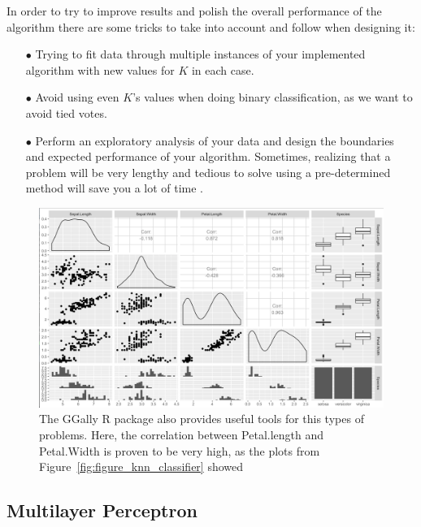 In order to try to improve results and polish the overall performance of the algorithm there are some tricks to take into account and follow when designing it: 

\begin{itemize}
	
	\item[$\bullet$] Trying to fit data through multiple instances of your implemented algorithm with new values for $K$ in each case.
	
	\item[$\bullet$] Avoid using even $K$'s values when doing binary classification, as we want to avoid tied votes.
	
	\item[$\bullet$] Perform an exploratory analysis of your data and design the boundaries and expected performance of your algorithm. Sometimes, realizing that a problem will be very lengthy and tedious to solve using a pre-determined method will save you a lot of time .
	
\end{itemize}

\begin{figure}[H]
	\centering
	\includegraphics[width=15cm]{Figuras_tfg/R_plot_correlation.png}
	\caption{The GGally R package also provides useful tools for this types of problems. Here, the correlation between \textrm{Petal.length} and \textrm{Petal.Width} is proven to be very high, as the plots from Figure~\ref{fig:figure_knn_classifier} showed}
	\label{fig:figure_knn_classifier_correlation}
\end{figure}

\subsection{Multilayer Perceptron}

